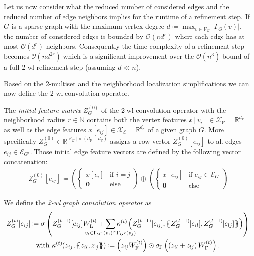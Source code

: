 \begin{enumerate}[label=\textbf{\arabic*.}]
		Let us now consider what the reduced number of considered edges and the reduced number of edge neighbors implies for the runtime of a refinement step.
		If $G$ is a sparse graph with the maximum vertex degree $d \coloneqq \max_{v \in \mathcal{V}_G} \left|\Gamma_G(v)\right|$, the number of considered edges is bounded by $\mathcal{O}(n d^r)$ where each edge has at most $\mathcal{O}(d^r)$ neighbors.
		Consequently the time complexity of a refinement step becomes $\mathcal{O}(n d^{2r})$ which is a significant improvement over the $\mathcal{O}(n^3)$ bound of a full 2-\acs{wl} refinement step (assuming $d \ll n$).
\end{enumerate}
Based on the 2-multiset and the neighborhood localization simplifications we can now define the 2-\ac{wl} convolution operator.
\begin{defn}\label{defn:ltd:wl2-conv-init}
	The \textit{initial feature matrix $Z_G^{(0)}$} of the 2-\acs{wl} convolution operator with the neighborhood radius $r \in \mathbb{N}$ contains both the vertex features $x[v_i] \in \mathcal{X}_{\mathcal{V}} = \mathbb{R}^{d_{\mathcal{V}}}$ as well as the edge features $x[e_{ij}] \in \mathcal{X}_{\mathcal{E}} = \mathbb{R}^{d_{\mathcal{E}}}$ of a given graph $G$.
	More specifically $Z_G^{(0)} \in \mathbb{R}^{{|\mathcal{E}_{G^r}|} \times (d_{\mathcal{V}} + d_{\mathcal{E}})}$ assigns a row vector $Z_G^{(0)}[e_{ij}]$ to all edges $e_{ij} \in \mathcal{E}_{G^r}$.
	Those initial edge feature vectors are defined by the following vector concatenation:
	\begin{align*}
		Z_G^{(0)}[e_{ij}] \coloneqq \left( \begin{cases}
			x[v_i] & \text{if $i = j$} \\
			\mathbf{0} & \text{else}
		\end{cases} \right) \oplus \left( \begin{cases}
			x[e_{ij}] & \text{if $e_{ij} \in \mathcal{E}_G$} \\
			\mathbf{0} & \text{else}
		\end{cases} \right)
	\end{align*}
\end{defn}
\begin{defn}\label{defn:ltd:wl2-conv-step}
	We define the \textit{2-\acs{wl} graph convolution operator} as
	\begin{gather*}
		Z_G^{(t)}[e_{ij}] \coloneqq \sigma\left( Z_G^{(t-1)}[e_{ij}] W_{\mathrm{L}}^{(t)} + \smashoperator[lr]{\sum_{v_l \in {\Gamma_{G^r}(v_i) \cap \Gamma_{G^r}(v_j)}}} \kappa^{(t)}\left( Z_G^{(t-1)}[e_{ij}], \ldblbrace Z_G^{(t-1)}[e_{il}], Z_G^{(t-1)}[e_{lj}] \rdblbrace \right) \right) \\
		\text{with } \kappa^{(t)}(z_{ij}, \ldblbrace z_{il}, z_{lj} \rdblbrace) \coloneqq \left( z_{ij} W_{\mathrm{F}}^{(t)} \right) \odot \sigma_{\Gamma}\left(\left( z_{il} + z_{lj} \right) W_{\Gamma}^{(t)} \right)
		\text{.}
	\end{gather*}
\end{defn}
